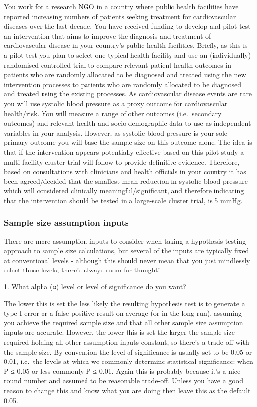 \documentclass[
]{book}
\begin{document}
You work for a research NGO in a country where public health facilities have reported increasing numbers of patients seeking treatment for cardiovascular diseases over the last decade. You have received funding to develop and pilot test an intervention that aims to improve the diagnosis and treatment of cardiovascular disease in your country's public health facilities. Briefly, as this is a pilot test you plan to select one typical health facility and use an (individually) randomised controlled trial to compare relevant patient health outcomes in patients who are randomly allocated to be diagnosed and treated using the new intervention processes to patients who are randomly allocated to be diagnosed and treated using the existing processes. As cardiovascular disease events are rare you will use systolic blood pressure as a proxy outcome for cardiovascular health/risk. You will measure a range of other outcomes (i.e.~secondary outcomes) and relevant health and socio-demographic data to use as independent variables in your analysis. However, as systolic blood pressure is your sole primary outcome you will base the sample size on this outcome alone. The idea is that if the intervention appears potentially effective based on this pilot study a multi-facility cluster trial will follow to provide definitive evidence. Therefore, based on consultations with clinicians and health officials in your country it has been agreed/decided that the smallest mean reduction in systolic blood pressure which will considered clinically meaningful/significant, and therefore indicating that the intervention should be tested in a large-scale cluster trial, is 5 mmHg.

\hypertarget{sample-size-assumption-inputs-2}{%
\subsubsection{Sample size assumption inputs}\label{sample-size-assumption-inputs-2}}

There are more assumption inputs to consider when taking a hypothesis testing approach to sample size calculations, but several of the inputs are typically fixed at conventional levels - although this should never mean that you just mindlessly select those levels, there's always room for thought!

1. What alpha (α) level or level of significance do you want?

The lower this is set the less likely the resulting hypothesis test is to generate a type I error or a false positive result on average (or in the long-run), assuming you achieve the required sample size and that all other sample size assumption inputs are accurate. However, the lower this is set the larger the sample size required holding all other assumption inputs constant, so there's a trade-off with the sample size. By convention the level of significance is usually set to be 0.05 or 0.01, i.e.~the levels at which we commonly determine statistical significance: when P ≤ 0.05 or less commonly P ≤ 0.01. Again this is probably because it's a nice round number and assumed to be reasonable trade-off. Unless you have a good reason to change this and know what you are doing then leave this as the default 0.05.
\end{document}
